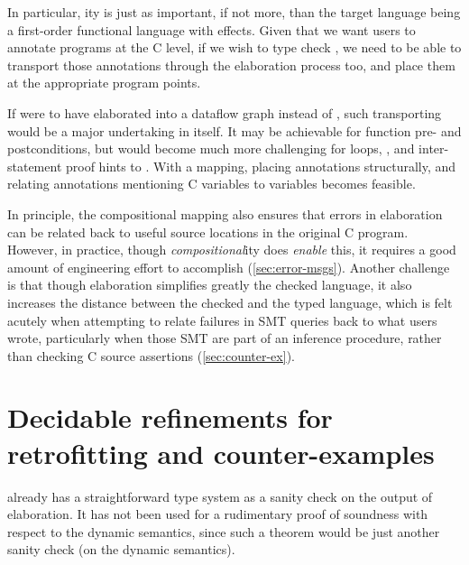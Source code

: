 In particular, ity is just as important, if not more, than the
target language being a first-order functional language with effects. Given
that we want users to annotate programs at the C level, if we wish to type
check , we need to be able to transport those annotations through the
elaboration process too, and place them at the appropriate program points.

If  were to have elaborated into a dataflow graph instead of ,
such transporting would be a major undertaking in itself. It may be achievable
for function pre- and postconditions, but would become much more challenging
for loops, , and inter-statement proof
hints to . With a  mapping, placing annotations
structurally, and relating annotations mentioning C variables to 
variables becomes feasible.

In principle, the compositional mapping also ensures that errors in 
elaboration can be related back to useful source locations in the original C
program. However, in practice, though \emph{compositional}ity does
\emph{enable} this, it requires a good amount of engineering effort to
accomplish (\cref{sec:error-msgs}). Another challenge is that though
elaboration simplifies greatly the checked language, it also increases the
distance between the checked and the typed language, which is felt acutely when
attempting to relate failures in SMT queries back to what users wrote,
particularly when those SMT are part of an inference procedure, rather
than checking C source assertions (\cref{sec:counter-ex}).

\section{Decidable refinements for retrofitting and counter-examples}

 already has a straightforward  type system as a
sanity check on the output of elaboration. It has not been used for a
rudimentary proof of soundness with respect to the dynamic semantics, since
such a theorem would be just another sanity check (on the dynamic semantics).

\begin{marginfigure}
    \centering
    \begin{mathpar}
    \end{mathpar}
    \caption{Checking rule for the  pure expression as %
        mentioned in \textcite{memarian2022cerberus}.}\label{fig:core-ub-typing}
\end{marginfigure}


